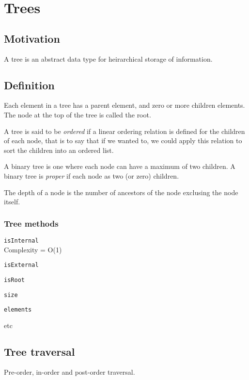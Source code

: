 
\section{Trees}

\subsection{Motivation}

A tree is an abstract data type for heirarchical storage of information.

\subsection{Definition}

Each element in a tree has a parent element, and zero or more children elements.
The node at the top of the tree is called the root.

A tree is said to be \textit{ordered} if a linear ordering relation is defined
for the children of each node, that is to say that if we wanted to, we could
apply this relation to sort the children into an ordered list.

A binary tree is one where each node can have a maximum of two children. A
binary tree is \textit{proper} if each node as two (or zero) children.

The depth of a node is the number of ancestors of the node exclusing the node
itself.


\subsubsection{Tree methods}

\begin{description}
	\item \texttt{isInternal}\\
		Complexity = O(1)
	\item \texttt{isExternal}
	\item \texttt{isRoot}\\
	\item \texttt{size}\\
	\item \texttt{elements}\\
	\item etc
\end{description}

\subsection{Tree traversal}

Pre-order, in-order and post-order traversal.

